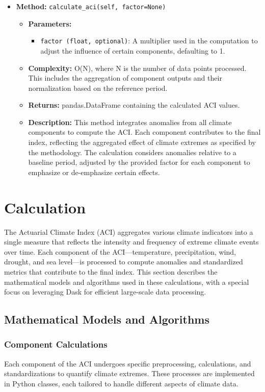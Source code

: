 \documentclass[a4paper,12pt]{article}
\begin{document}
\begin{itemize}
    \item \textbf{Method:} \texttt{calculate\_aci(self, factor=None)}
    \begin{itemize}
        \item \textbf{Parameters:}
        \begin{itemize}
            \item \texttt{factor (float, optional)}: A multiplier used in the computation to adjust the influence of certain components, defaulting to 1.
        \end{itemize}
        \item \textbf{Complexity:} O(N), where N is the number of data points processed. This includes the aggregation of component outputs and their normalization based on the reference period.
        \item \textbf{Returns:} pandas.DataFrame containing the calculated ACI values.
        \item \textbf{Description:} This method integrates anomalies from all climate components to compute the ACI. Each component contributes to the final index, reflecting the aggregated effect of climate extremes as specified by the methodology. The calculation considers anomalies relative to a baseline period, adjusted by the provided factor for each component to emphasize or de-emphasize certain effects.
    \end{itemize}
\end{itemize}


\section{Calculation}
\label{sec:calculation}

The Actuarial Climate Index (ACI) aggregates various climate indicators into a single measure that reflects the intensity and frequency of extreme climate events over time. Each component of the ACI—temperature, precipitation, wind, drought, and sea level—is processed to compute anomalies and standardized metrics that contribute to the final index. This section describes the mathematical models and algorithms used in these calculations, with a special focus on leveraging Dask for efficient large-scale data processing.

\subsection{Mathematical Models and Algorithms}
\subsubsection{Component Calculations }
Each component of the ACI undergoes specific preprocessing, calculations, and standardizations to quantify climate extremes. These processes are implemented in Python classes, each tailored to handle different aspects of climate data.
\end{document}

